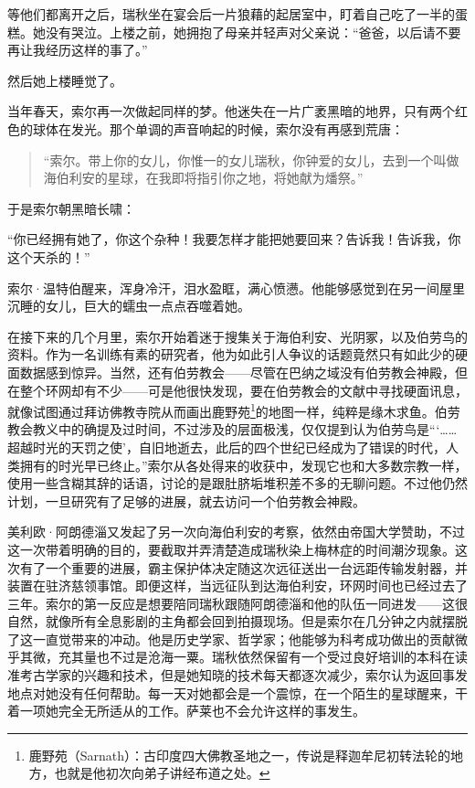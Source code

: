 \documentclass[AutoFakeBold=true]{book}
\begin{document}
等他们都离开之后，瑞秋坐在宴会后一片狼藉的起居室中，盯着自己吃了一半的蛋糕。她没有哭泣。上楼之前，她拥抱了母亲并轻声对父亲说：``爸爸，以后请不要再让我经历这样的事了。''

然后她上楼睡觉了。

\vspace*{1em}

当年春天，索尔再一次做起同样的梦。他迷失在一片广袤黑暗的地界，只有两个红色的球体在发光。那个单调的声音响起的时候，索尔没有再感到荒唐：

\begin{quotation}
	{\kaishu ``索尔。带上你的女儿，你惟一的女儿瑞秋，你钟爱的女儿，去到一个叫做海伯利安的星球，在我即将指引你之地，将她献为燔祭。''}
\end{quotation}

于是索尔朝黑暗长啸：

``你已经拥有她了，你这个杂种！我要怎样才能把她要回来？告诉我！告诉我，你这个天杀的！''

索尔·温特伯醒来，浑身冷汗，泪水盈眶，满心愤懑。他能够感觉到在另一间屋里沉睡的女儿，巨大的蠕虫一点点吞噬着她。

\vspace*{1em}

在接下来的几个月里，索尔开始着迷于搜集关于海伯利安、光阴冢，以及伯劳鸟的资料。作为一名训练有素的研究者，他为如此引人争议的话题竟然只有如此少的硬面数据感到惊异。当然，还有伯劳教会——尽管在巴纳之域没有伯劳教会神殿，但在整个环网却有不少——可是他很快发现，要在伯劳教会的文献中寻找硬面讯息，就像试图通过拜访佛教寺院从而画出鹿野苑\footnote{鹿野苑（Sarnath）：古印度四大佛教圣地之一，传说是释迦牟尼初转法轮的地方，也就是他初次向弟子讲经布道之处。}的地图一样，纯粹是缘木求鱼。伯劳教会教义中的确提及过时间，不过涉及的层面极浅，仅仅提到认为伯劳鸟是```……超越时光的天罚之使'，自旧地逝去，此后的四个世纪已经成为了错误的时代，人类拥有的时光早已终止。''索尔从各处得来的收获中，发现它也和大多数宗教一样，使用一些含糊其辞的话语，讨论的是跟肚脐垢堆积差不多的无聊问题。不过他仍然计划，一旦研究有了足够的进展，就去访问一个伯劳教会神殿。

美利欧·阿朗德淄又发起了另一次向海伯利安的考察，依然由帝国大学赞助，不过这一次带着明确的目的，要截取并弄清楚造成瑞秋染上梅林症的时间潮汐现象。这次有了一个重要的进展，霸主保护体决定随这次远征送出一台远距传输发射器，并装置在驻济慈领事馆。即便这样，当远征队到达海伯利安，环网时间也已经过去了三年。索尔的第一反应是想要陪同瑞秋跟随阿朗德淄和他的队伍一同进发——这很自然，就像所有全息影剧的主角都会回到拍摄现场。但是索尔在几分钟之内就摆脱了这一直觉带来的冲动。他是历史学家、哲学家；他能够为科考成功做出的贡献微乎其微，充其量也不过是沧海一粟。瑞秋依然保留有一个受过良好培训的本科在读准考古学家的兴趣和技术，但是她知晓的技术每天都逐次减少，索尔认为返回事发地点对她没有任何帮助。每一天对她都会是一个震惊，在一个陌生的星球醒来，干着一项她完全无所适从的工作。萨莱也不会允许这样的事发生。
\end{document}

